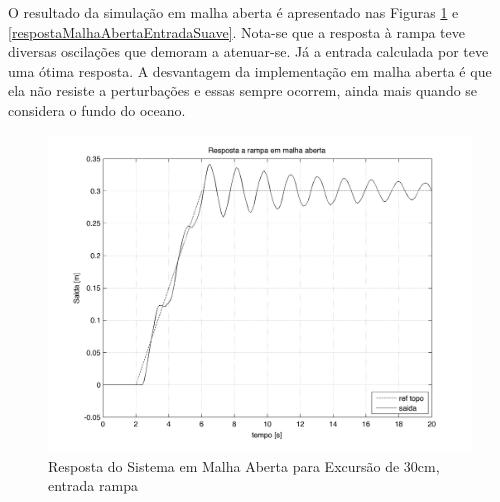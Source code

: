  O resultado da simulação em malha aberta é apresentado nas Figuras \ref{respostaMalhaAbertaRampa} e \ref{respostaMalhaAbertaEntradaSuave}. Nota-se que a resposta à rampa teve diversas oscilações que demoram a atenuar-se. Já a entrada calculada por \cite{rafaelMestrado} teve uma ótima resposta. A desvantagem da implementação em malha aberta é que ela não resiste a perturbações e essas sempre ocorrem, ainda mais quando se considera o fundo do oceano.
 
 \begin{figure}[!htb]
    \centering
    \begin{minipage}{.45\textwidth}
        \centering
        
        \includegraphics[width=1\linewidth]{figs/resultados/simulacao/respostaMalhaAbertaRampa}
        \caption{Resposta do Sistema em Malha Aberta para Excursão de 30cm, entrada rampa\label{respostaMalhaAbertaRampa}}
    \end{minipage}%
    \hspace{0.1cm}
    \begin{minipage}{0.45\textwidth}
        \centering
        

\end{minipage}
\end{figure}
